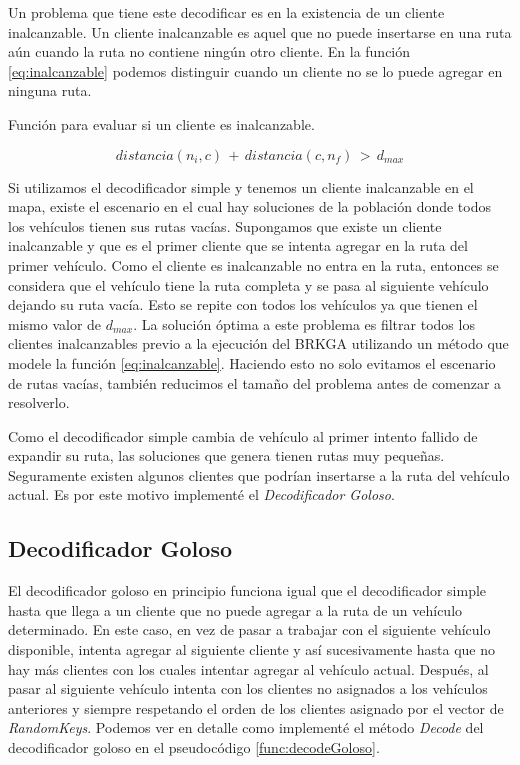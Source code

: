 \bigskip

Un problema que tiene este decodificar es en la existencia de un cliente inalcanzable. Un cliente inalcanzable es aquel que no puede insertarse en una ruta aún cuando la ruta no contiene ningún otro cliente. En la función \ref{eq:inalcanzable} podemos distinguir cuando un cliente no se lo puede agregar en ninguna ruta.

\bigskip

\begin{mycapequ}[!ht]
	\caption{Función para evaluar si un cliente es inalcanzable.}
	\begin{equation} \label{eq:inalcanzable}
	distancia(n_i, c)\, +\, distancia(c, n_f)\, >\, d_{max}
	\end{equation}
\end{mycapequ}

\bigskip

Si utilizamos el decodificador simple y tenemos un cliente inalcanzable en el mapa, existe el escenario en el cual hay soluciones de la población donde todos los vehículos tienen sus rutas vacías. Supongamos que existe un cliente inalcanzable y que es el primer cliente que se intenta agregar en la ruta del primer vehículo. Como el cliente es inalcanzable no entra en la ruta, entonces se considera que el vehículo tiene la ruta completa y se pasa al siguiente vehículo dejando su ruta vacía. Esto se repite con todos los vehículos ya que tienen el mismo valor de $d_{max}$. La solución óptima a este problema es filtrar todos los clientes inalcanzables previo a la ejecución del BRKGA utilizando un método que modele la función \ref{eq:inalcanzable}. Haciendo esto no solo evitamos el escenario de rutas vacías, también reducimos el tamaño del problema antes de comenzar a resolverlo. 

\bigskip

Como el decodificador simple cambia de vehículo al primer intento fallido de expandir su ruta, las soluciones que genera tienen rutas muy pequeñas. Seguramente existen algunos clientes que podrían insertarse a la ruta del vehículo actual. Es por este motivo implementé el \textit{Decodificador Goloso}.


\subsection{Decodificador Goloso}

El decodificador goloso en principio funciona igual que el decodificador simple hasta que llega a un cliente que no puede agregar a la ruta de un vehículo determinado. En este caso, en vez de pasar a trabajar con el siguiente vehículo disponible, intenta agregar al siguiente cliente y así sucesivamente hasta que no hay más clientes con los cuales intentar agregar al vehículo actual. Después, al pasar al siguiente vehículo intenta con los clientes no asignados a los vehículos anteriores y siempre respetando el orden de los clientes asignado por el vector de \textit{RandomKeys}. Podemos ver en detalle como implementé el método \textit{Decode} del decodificador goloso en el pseudocódigo \ref{func:decodeGoloso}.  

